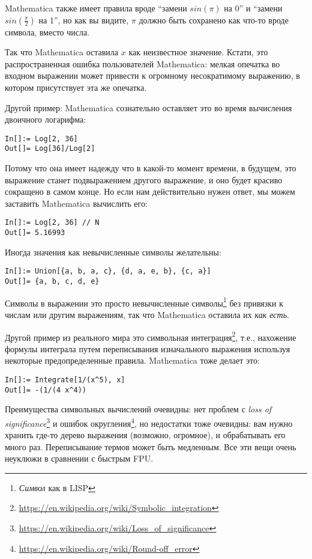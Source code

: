 Mathematica также имеет правила вроде ``замени $sin(\pi)$ на 0'' и ``замени $sin(\frac{\pi}{2})$ на 1'', но как вы видите,
$\pi$ должно быть сохранено как что-то вроде символа, вместо числа.

Так что Mathematica оставила $x$ как неизвестное значение.
Кстати, это распространенная ошибка пользователей Mathematica: мелкая опечатка во входном выражении может привести к
огромному несократимому выражению, в котором присутствует эта же опечатка.

Другой пример: Mathematica сознательно оставляет это во время вычисления двоичного логарифма:

\begin{lstlisting}
In[]:= Log[2, 36]
Out[]= Log[36]/Log[2]
\end{lstlisting}

Потому что она имеет надежду что в какой-то момент времени, в будущем, это выражение станет подвыражением другого
выражение, и оно будет красиво сокращено в самом конце.
Но если нам действительно нужен ответ, мы можем заставить Mathematica вычислить его:

\begin{lstlisting}
In[]:= Log[2, 36] // N
Out[]= 5.16993
\end{lstlisting}

Иногда значения как невычисленные символы желательны:

\begin{lstlisting}
In[]:= Union[{a, b, a, c}, {d, a, e, b}, {c, a}]
Out[]= {a, b, c, d, e}
\end{lstlisting}

Символы в выражении это просто невычисленные символы\footnote{\textit{Символ} как в LISP} без привязки
к числам или другим выражениям, так что Mathematica оставила их \textit{как есть}.

Другой пример из реального мира это символьная интеграция\footnote{\url{https://en.wikipedia.org/wiki/Symbolic_integration}}, 
т.е., нахожение формулы интеграла путем переписывания изначального выражения используя некоторые предопределенные правила.
Mathematica тоже делает это:

\begin{lstlisting}
In[]:= Integrate[1/(x^5), x]
Out[]= -(1/(4 x^4))
\end{lstlisting}

Преимущества символьных вычислений очевидны: нет проблем с \textit{loss of significance}\footnote{\url{https://en.wikipedia.org/wiki/Loss_of_significance}} и ошибок округления\footnote{\url{https://en.wikipedia.org/wiki/Round-off_error}}, 
но недостатки тоже очевидны: вам нужно хранить где-то дерево выражения (возможно, огромное), и обрабатывать его много раз.
Переписывание термов может быть медленным.
Все эти вещи очень неуклюжи в сравнении с быстрым \ac{FPU}.

